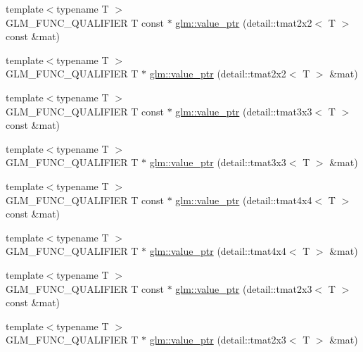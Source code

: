 \begin{DoxyCompactItemize}
\item 
{\footnotesize template$<$typename T $>$ }\\\-G\-L\-M\-\_\-\-F\-U\-N\-C\-\_\-\-Q\-U\-A\-L\-I\-F\-I\-E\-R \-T const $\ast$ \hyperlink{group__gtc__type__ptr_gabc0ecc372916bebbd130341cb0799376}{glm\-::value\-\_\-ptr} (detail\-::tmat2x2$<$ \-T $>$ const \&mat)
\item 
{\footnotesize template$<$typename T $>$ }\\\-G\-L\-M\-\_\-\-F\-U\-N\-C\-\_\-\-Q\-U\-A\-L\-I\-F\-I\-E\-R \-T $\ast$ \hyperlink{group__gtc__type__ptr_ga09141ef8c41ab15f7989b620e748ae3c}{glm\-::value\-\_\-ptr} (detail\-::tmat2x2$<$ \-T $>$ \&mat)
\item 
{\footnotesize template$<$typename T $>$ }\\\-G\-L\-M\-\_\-\-F\-U\-N\-C\-\_\-\-Q\-U\-A\-L\-I\-F\-I\-E\-R \-T const $\ast$ \hyperlink{group__gtc__type__ptr_ga23b2a53a00923f747637fc271f78e9db}{glm\-::value\-\_\-ptr} (detail\-::tmat3x3$<$ \-T $>$ const \&mat)
\item 
{\footnotesize template$<$typename T $>$ }\\\-G\-L\-M\-\_\-\-F\-U\-N\-C\-\_\-\-Q\-U\-A\-L\-I\-F\-I\-E\-R \-T $\ast$ \hyperlink{group__gtc__type__ptr_ga2cadd2b9a774d77c66e8f723b729c4e7}{glm\-::value\-\_\-ptr} (detail\-::tmat3x3$<$ \-T $>$ \&mat)
\item 
{\footnotesize template$<$typename T $>$ }\\\-G\-L\-M\-\_\-\-F\-U\-N\-C\-\_\-\-Q\-U\-A\-L\-I\-F\-I\-E\-R \-T const $\ast$ \hyperlink{group__gtc__type__ptr_ga1e7076c8387f3e7436a00453a1f5fe5e}{glm\-::value\-\_\-ptr} (detail\-::tmat4x4$<$ \-T $>$ const \&mat)
\item 
{\footnotesize template$<$typename T $>$ }\\\-G\-L\-M\-\_\-\-F\-U\-N\-C\-\_\-\-Q\-U\-A\-L\-I\-F\-I\-E\-R \-T $\ast$ \hyperlink{group__gtc__type__ptr_gadc0d39ee1a6b84a4337840746649cca3}{glm\-::value\-\_\-ptr} (detail\-::tmat4x4$<$ \-T $>$ \&mat)
\item 
{\footnotesize template$<$typename T $>$ }\\\-G\-L\-M\-\_\-\-F\-U\-N\-C\-\_\-\-Q\-U\-A\-L\-I\-F\-I\-E\-R \-T const $\ast$ \hyperlink{group__gtc__type__ptr_ga7a07a13118bdceeaef82e330f8f47fcf}{glm\-::value\-\_\-ptr} (detail\-::tmat2x3$<$ \-T $>$ const \&mat)
\item 
{\footnotesize template$<$typename T $>$ }\\\-G\-L\-M\-\_\-\-F\-U\-N\-C\-\_\-\-Q\-U\-A\-L\-I\-F\-I\-E\-R \-T $\ast$ \hyperlink{group__gtc__type__ptr_gac99ce6d08fb5b645d543ea875567ea3b}{glm\-::value\-\_\-ptr} (detail\-::tmat2x3$<$ \-T $>$ \&mat)

\end{DoxyCompactItemize}
